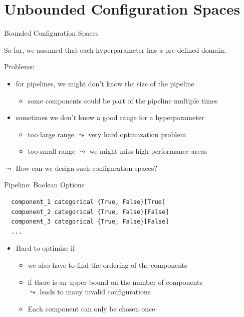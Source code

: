 \section{Unbounded Configuration Spaces}
\begin{frame}[c]{Bounded Configuration Spaces}

So far, we assumed that each hyperparameter has a pre-defined domain.

\medskip
Problems:
\begin{itemize}
  \item for pipelines, we might don't know the size of the pipeline
	\begin{itemize}
		\item some components could be part of the pipeline multiple times
	\end{itemize}
  \pause
  \medskip
  \item sometimes we don't know a good range for a hyperparameter
  \begin{itemize}
     \item too large range $\leadsto$ very hard optimization problem
     \item too small range $\leadsto$ we might miss high-performance areas
  \end{itemize}

\end{itemize}

\pause
\bigskip

$\leadsto$ How can we design such configuration spaces?

\end{frame}
\begin{frame}[c, fragile]{Pipeline: Boolean Options}


\begin{verbatim}
  component_1 categorical {True, False}[True]
  component_2 categorical {True, False}[False]
  component_3 categorical {True, False}[False]
  ...
\end{verbatim}

\begin{itemize}
	\item Hard to optimize if 
	\begin{itemize}
		\item we also have to find the ordering of the components
		\item if there is an upper bound on the number of components\\
		$\leadsto$ leads to many invalid configurations
		\item Each component can only be chosen once
	\end{itemize}
\end{itemize}

\end{frame}
